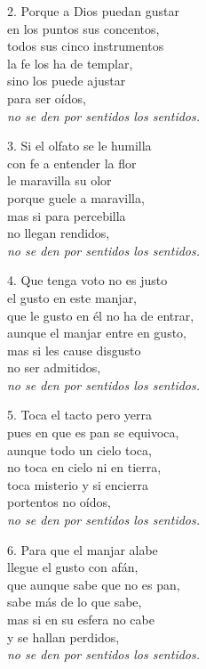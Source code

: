 \def\tagline{\emph{no se den por sentidos los sentidos.}}

\begin{blocklyrics}
2. Porque a Dios puedan gustar\\
en los puntos sus concentos,\\
todos sus cinco instrumentos\\
la fe los ha de templar,\\
sino los puede ajustar\\
para ser oídos,\\
\tagline

3. Si el olfato se le humilla\\
con fe a entender la flor\\ %
le maravilla su olor\\
porque guele a maravilla,\\
mas si para percebilla\\
no llegan rendidos,\\
\tagline

4. Que tenga voto no es justo\\
el gusto en este manjar,\\
que le gusto en él no ha de entrar,\\
aunque el manjar entre en gusto,\\
mas si les cause disgusto\\ %
no ser admitidos,\\
\tagline

5. Toca el tacto pero yerra\\%
pues en que es pan se equivoca,\\
aunque todo un cielo toca,\\
no toca en cielo ni en tierra,\\
toca misterio y si encierra\\
portentos no oídos,\\
\tagline

6. Para que el manjar alabe\\
llegue el gusto con afán,\\
que aunque sabe que no es pan,\\
sabe más de lo que sabe,\\
mas si en su esfera no cabe\\
y se hallan perdidos,\\
\tagline
\end{blocklyrics}